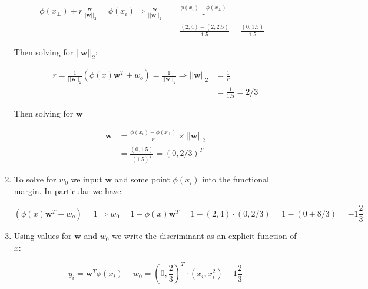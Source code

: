 \documentclass[submit]{harvardml}
\begin{document}
\begin{enumerate}
	\begin{align*}
	\phi(x_\perp)+r\frac{\mathbf{w}}{||\mathbf{w}||_2}=\phi(x_i) \Rightarrow \frac{\mathbf{w}}{||\mathbf{w}||_2} & = \frac{\phi(x_i)-\phi(x_\perp)}{r} \\
	& = \frac{(2,4)-(2,2.5)}{1.5} = \frac{(0,1.5)}{1.5} &
	\end{align*}
	
	Then solving for $||\mathbf{w}||_2$:
	
	\begin{align*}
	r = \frac{1}{||\mathbf{w}||_2}(\phi(x)\mathbf{w}^T+w_o) = \frac{1}{||\mathbf{w}||_2} \Rightarrow ||\mathbf{w}||_2 & = \frac{1}{r} \\
	& = \frac{1}{1.5} = 2/3
	\end{align*}
	
	Then solving for $\mathbf{w}$
	
	\begin{align*}
	\mathbf{w} & = \frac{\phi(x_i)-\phi(x_\perp)}{r} \times ||\mathbf{w}||_2 \\
	& = \frac{(0,1.5)}{(1.5)^2} = (0, 2/3)^T
	\end{align*}
	
	\item To solve for $w_0$ we input $\mathbf{w}$ and some point $\phi(x_i)$ into the functional margin. In particular we have:
	
	\[
	(\phi(x)\mathbf{w}^T+w_o) = 1 \Rightarrow w_0 = 1 - \phi(x)\mathbf{w}^T = 1 - (2,4)\cdot(0,2/3) = 1 - (0 + 8/3) = -1 \frac{2}{3}
	\]
	
	\item Using values for $\mathbf{w}$ and $w_0$ we write the discriminant as an explicit function of $x$:
	
	\begin{equation}
	y_i = \mathbf{w}^T\phi(x_i)+w_0 = (0,\frac{2}{3})^T\cdot(x_i,x_i^2) - 1\frac{2}{3}
	\end{equation}
\end{enumerate}
\end{document}
